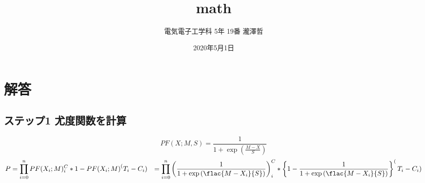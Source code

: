 \documentclass[uplatex, a4paper, 10pt, oneside, twocolumn]{jsarticle}
\title{math}
\author{電気電子工学科 5年 19番 瀧澤哲}
\date{2020年5月1日}
\begin{document}
%

\maketitle

\section*{解答}
  \subsection*{ステップ1 尤度関数を計算}
    \begin{equation}
      PF(X;M,S) = \frac{1}{1 + \exp \left(\frac{M-X}{S}\right)}
    \end{equation}
    \begin{equation}
      \begin{split}
        P &= \prod_{i=0}^n PF(X_i; M)^C_i * {1 - PF(X_i; M)}^(T_i - C_i)
          &= \prod_{i=0}^n \left(\frac{1}{1+\exp \left(\flac{M-X_i}{S}\right)}\right)^C_i * \left\{1 - \frac{1}{1+\exp \left(\flac{M-X_i}{S}\right)}\right\}^(T_i - C_i)
      \end{split}
    \end{equation}

\end{document}
